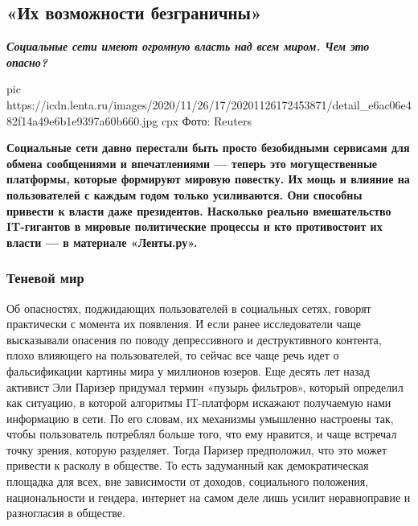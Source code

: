 
 
 
 
 
 
\subsection{«Их возможности безграничны»}
\label{sec:27_11_2020.news.ru.lenta_ru.1.soc_seti}


\begin{center}
	\begingroup
		\bfseries\em\Large\color{orange}
		Социальные сети имеют огромную власть над всем миром. Чем это опасно?
	\endgroup
\end{center}

\ifcmt
pic https://icdn.lenta.ru/images/2020/11/26/17/20201126172453871/detail_e6ac06e482f14a49e6b1e9397a60b660.jpg
cpx Фото: Reuters
\fi

\begin{leftbar}
	\begingroup
	\bfseries\color{blue}\large
Социальные сети давно перестали быть просто безобидными сервисами для обмена
сообщениями и впечатлениями — теперь это могущественные платформы,
которые формируют мировую повестку. Их мощь и влияние на пользователей
с каждым годом только усиливаются. Они способны привести к власти даже
президентов. Насколько реально вмешательство IT-гигантов в мировые
политические процессы и кто противостоит их власти — в материале
«Ленты.ру».
	\endgroup
\end{leftbar}

\subsubsection{Теневой мир}

Об опасностях, поджидающих пользователей в социальных сетях, говорят
практически с момента их появления. И если ранее исследователи чаще высказывали
опасения по поводу депрессивного и деструктивного контента, плохо влияющего на
пользователей, то сейчас все чаще речь идет о фальсификации картины мира у
миллионов юзеров. Еще десять лет назад активист Эли Паризер придумал термин
«пузырь фильтров», который определил как ситуацию, в которой алгоритмы
IT-платформ искажают получаемую нами информацию в сети. По его словам, их
механизмы умышленно настроены так, чтобы пользователь потреблял больше того,
что ему нравится, и чаще встречал точку зрения, которую разделяет. Тогда
Паризер предположил, что это может привести к расколу в обществе. То есть
задуманный как демократическая площадка для всех, вне зависимости от доходов,
социального положения, национальности и гендера, интернет на самом деле лишь
усилит неравноправие и разногласия в обществе.

